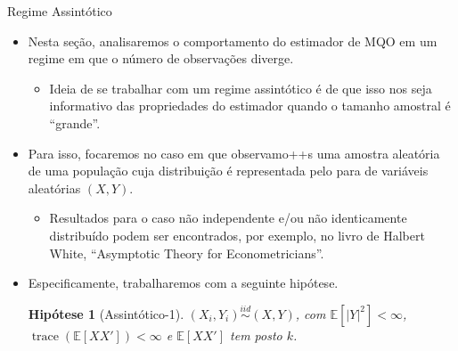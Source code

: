 \documentclass[11pt]{beamer}
\newtheorem{assumption}{Hipótese}
\begin{document}
\begin{frame}{Regime Assintótico}
	\begin{itemize}
		\item Nesta seção, analisaremos o comportamento do estimador de MQO em um regime em que o número de observações diverge.
		\begin{itemize}
			\item Ideia de se trabalhar com um regime assintótico é de que isso nos seja informativo das propriedades do estimador quando o tamanho amostral é ``grande''.
		\end{itemize}
		\item Para isso, focaremos no caso em que observamo++s uma amostra aleatória de uma população cuja distribuição é representada pelo para de variáveis aleatórias $(X,Y)$.
		\begin{itemize}
			\item Resultados para o caso não independente e/ou não identicamente distribuído podem ser encontrados, por exemplo, no livro de Halbert White, ``Asymptotic Theory for Econometricians''.
		\end{itemize}
		\item Especificamente, trabalharemos com a seguinte hipótese.
		\begin{assumption}[Assintótico-1]
		$(X_i,Y_i) \overset{iid}{\sim} (X,Y)$, com $\mathbb{E}[|Y|^2]<\infty$, $\operatorname{trace}(\mathbb{E}[XX']) < \infty$ e $\mathbb{E}[XX']$ tem posto $k$.
		\end{assumption}
	\end{itemize}
\end{frame}
\end{document}

